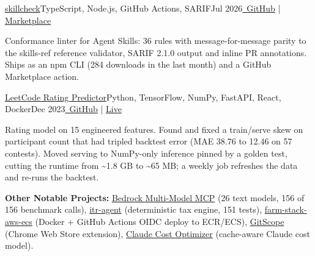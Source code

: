 \resumeExp
{\href{https://github.com/Sagargupta16/skillcheck}{skillcheck}}{TypeScript, Node.js, GitHub Actions, SARIF}{Jul 2026}{\href{https://github.com/Sagargupta16/skillcheck}{\faGithub\ GitHub} | \href{https://github.com/marketplace/actions/skillcheck-for-agent-skills}{Marketplace}}
\resumeItemListStart
    \item[$\diamond$] Conformance linter for Agent Skills: 36 rules with message-for-message parity to the skills-ref reference validator, SARIF 2.1.0 output and inline PR annotations. Ships as an npm CLI (284 downloads in the last month) and a GitHub Marketplace action.
\resumeItemListEnd

\resumeExp
{\href{https://leetcode-rating-predictor.onrender.com/}{LeetCode Rating Predictor}}{Python, TensorFlow, NumPy, FastAPI, React, Docker}{Dec 2023}{\href{https://github.com/Sagargupta16/LeetCode_Rating_Predictor}{\faGithub\ GitHub} | \href{https://leetcode-rating-predictor.onrender.com/}{Live}}
\resumeItemListStart
    \item[$\diamond$] Rating model on 15 engineered features. Found and fixed a train/serve skew on participant count that had tripled backtest error (MAE 38.76 to 12.46 on 57 contests). Moved serving to NumPy-only inference pinned by a golden test, cutting the runtime from \textasciitilde1.8 GB to \textasciitilde65 MB; a weekly job refreshes the data and re-runs the backtest.
\resumeItemListEnd

\resumeSubHeadingListEnd
\vspace{-2pt}
\small{\textbf{Other Notable Projects:} \href{https://github.com/Sagargupta16/bedrock-multi-model-mcp}{Bedrock Multi-Model MCP} (26 text models, 156 of 156 benchmark calls), \href{https://github.com/Sagargupta16/itr-agent}{itr-agent} (deterministic tax engine, 151 tests), \href{https://github.com/Sagargupta16/farm-stack-aws-ecs}{farm-stack-aws-ecs} (Docker + GitHub Actions OIDC deploy to ECR/ECS), \href{https://chromewebstore.google.com/detail/gitscope/fndaanihifimmlnmkjdmjbbkbdajolff}{GitScope} (Chrome Web Store extension), \href{https://github.com/Sagargupta16/claude-cost-optimizer}{Claude Cost Optimizer} (cache-aware Claude cost model).}
\vspace{-2mm}
